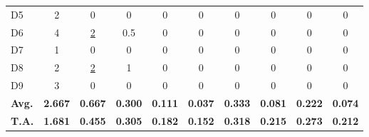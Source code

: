 \begin{table}[ht]
{\begin{tabular}{l|c|cc|cc|cc|cc}
D5 & 2 & 0 & 0 & 0 & 0 & 0 & 0 & 0 & 0  \\
D6 & 4 & \underline{2} & 0.5 & 0 & 0 & 0 & 0 & 0 & 0  \\
D7 & 1 & 0 & 0 & 0 & 0 & 0 & 0 & 0 & 0  \\
D8 & 2 & \underline{2} & 1 & 0 & 0 & 0 & 0 & 0 & 0  \\
D9 & 3 & 0 & 0 & 0 & 0 & 0 & 0 & 0 & 0  \\
    \midrule
\textbf{Avg.} & \textbf{2.667} & \textbf{0.667} & \textbf{0.300} & \textbf{0.111} & \textbf{0.037} & \textbf{0.333} & \textbf{0.081} & \textbf{0.222} & \textbf{0.074} \\ 			
    \midrule
\textbf{T.A.} & \textbf{1.681} & \textbf{0.455} & \textbf{0.305} & \textbf{0.182} & \textbf{0.152} & \textbf{0.318} & \textbf{0.215} & \textbf{0.273} & \textbf{0.212} \\
    \bottomrule
  \end{tabular}
  }
\end{table}
